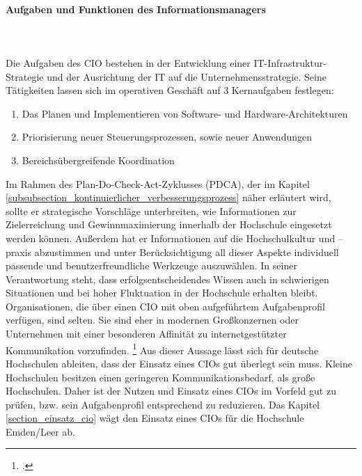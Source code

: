 \paragraph{Aufgaben und Funktionen des Informationsmanagers}\mbox{}\\\\
\label{aufgaben_funktionen_informationsmanager}
Die Aufgaben des CIO bestehen in der Entwicklung einer IT-Infrastruktur-Strategie und der Ausrichtung der IT auf die Unternehmensstrategie. Seine Tätigkeiten lassen sich im operativen Geschäft auf 3 Kernaufgaben festlegen: 
\begin{enumerate}
	\item Das Planen und Implementieren von Software- und Hardware-Architekturen 
	\item Priorisierung neuer Steuerungsprozessen, sowie neuer Anwendungen
	\item Bereichsübergreifende Koordination
\end{enumerate}

Im Rahmen des Plan-Do-Check-Act-Zyklusses (PDCA), der im Kapitel  \ref{subsubsection_kontinuierlicher_verbesserungsprozess} näher erläutert wird,  sollte er strategische Vorschläge unterbreiten, wie Informationen zur Zielerreichung und Gewinnmaximierung innerhalb der Hochschule eingesetzt werden können. Außerdem hat er Informationen auf die Hochschulkultur und –praxis  abzustimmen und unter Berücksichtigung all dieser Aspekte individuell passende und benutzerfreundliche Werkzeuge auszuwählen. In seiner Verantwortung steht, dass erfolgsentscheidendes Wissen auch in schwierigen Situationen und bei hoher Fluktuation in der Hochschule erhalten bleibt. 
Organisationen, die über einen CIO mit oben aufgeführtem Aufgabenprofil verfügen, sind selten. Sie sind eher in modernen Großkonzernen oder Unternehmen mit einer besonderen Affinität zu internetgestützter Kommunikation vorzufinden. \footcite[Vgl.][404]{becker_gora_uhrig_2012} Aus dieser Aussage lässt sich für deutsche Hochschulen ableiten, dass der Einsatz eines CIOs gut überlegt sein muss. Kleine Hochschulen besitzen einen geringeren Kommunikationsbedarf, als große Hochschulen. Daher ist der Nutzen und Einsatz eines CIOs im Vorfeld gut zu prüfen, bzw. sein Aufgabenprofil entsprechend zu reduzieren. Das Kapitel \ref{section_einsatz_cio} wägt den Einsatz eines CIOs für die Hochschule Emden/Leer ab.

